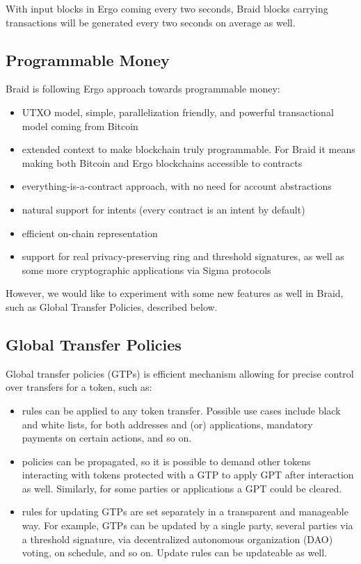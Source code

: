 \documentclass{llncs}   %
\newcommand{\bc}{Braid}
\begin{document}
With input blocks in Ergo coming every two seconds, \bc{} blocks carrying transactions will be generated every two seconds on average as well.

\subsection{Programmable Money}

\bc{} is following Ergo approach towards programmable money:
\begin{itemize}
  \item UTXO model, simple, parallelization friendly, and powerful transactional model coming from Bitcoin
  \item extended context to make blockchain truly programmable. For \bc{} it means making both Bitcoin and Ergo
  blockchains accessible to contracts
  \item everything-is-a-contract approach, with no need for account abstractions
  \item natural support for intents (every contract is an intent by default)
  \item efficient on-chain representation
  \item support for real privacy-preserving ring and threshold signatures, as well as some more cryptographic
  applications via Sigma protocols
\end{itemize}

However, we would like to experiment with some new features as well in \bc{}, such as Global Transfer Policies,
described below.

\subsection{Global Transfer Policies}

Global transfer policies (GTPs) is efficient mechanism allowing for precise control over transfers for a token, such as:
\begin{itemize}
  \item rules can be applied to any token transfer. Possible use cases include black and white lists, for both addresses
  and (or) applications, mandatory payments on certain actions, and so on.
  \item policies can be propagated, so it is possible to demand other tokens interacting with tokens protected with a GTP to
  apply GPT after interaction as well. Similarly, for some parties or applications a GPT could be cleared.
  \item rules for updating GTPs are set separately in a transparent and manageable way. For example, GTPs can be updated
  by a single party, several parties via a threshold signature, via decentralized autonomous organization (DAO) voting,
  on schedule, and so on. Update rules can be updateable as well.
\end{itemize}
\end{document}
